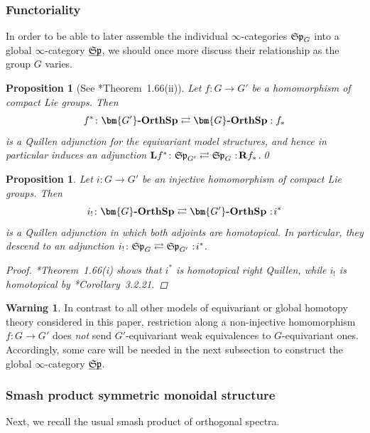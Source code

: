 \documentclass[reqno]{memo-l}
\theoremstyle{mythm}
\newtheorem{prop}[thm]{Proposition}
\theoremstyle{definition}
\newtheorem{warn}[thm]{Warning}
\numberwithin{equation}{section}
\newcommand{\cat}[1]{\textbf{\textup{#1}}}
\newcommand{\ulhelper}[2]{\underline{\setbox0=\hbox{$#1#2$}\dp0=0.4pt \box0\relax}}
\newcommand{\ul}[1]{{\mathpalette\ulhelper{#1}}\hbox{\rule[-2pt]{0pt}{0pt}}}
\newcommand\noloc{%
	\nobreak
	\mspace{6mu plus 1mu}
	{:}
	\nonscript\mkern-\thinmuskip
	\mathpunct{}
	\mspace{2mu}
}
\newcommand{\mySp}{{\mathfrak S\kern-.5pt\mathfrak p}}
\newcommand{\Gosp}[1]{\cat{$\bm{#1}$-OrthSp}}
\begin{document}
\subsubsection{Functoriality} In order to be able to later assemble the individual $\infty$-categories $\mySp_G$ into a global $\infty$-category $\ul\mySp$, we should once more discuss their relationship as the group $G$ varies.

\begin{prop}[See \cite{DHLPS2019Proper}*{Theorem~1.66(ii)}]\label{prop:restr-left-Quillen-G-Sp}
    Let $f\colon G\to G'$ be a homomorphism of compact Lie groups. Then
    \[
        f^*\colon\Gosp{G'}\rightleftarrows\Gosp{G}:f_*
    \]
    is a Quillen adjunction for the equivariant model structures, and hence in particular induces an adjunction $\cat{L}f^*\colon\mySp_{G'}\rightleftarrows\mySp_G\noloc\cat{R}f_*$.\qed
\end{prop}

\begin{prop}\label{prop:i!-left-Quillen-equiv-sp}
    Let $i\colon G\to G'$ be an \emph{injective} homomorphism of compact Lie groups. Then
    \[
        i_!\colon\Gosp{G}\rightleftarrows\Gosp{G'}\noloc i^*
    \]
    is a Quillen adjunction in which both adjoints are homotopical. In particular, they descend to an adjunction $i_!\colon\mySp_G\rightleftarrows\mySp_{G'}\noloc i^*$.
    \begin{proof}
        \cite{DHLPS2019Proper}*{Theorem~1.66(i)} shows that $i^*$ is homotopical right Quillen, while $i_!$ is homotopical by \cite{schwede2018global}*{Corollary~3.2.21}.
    \end{proof}
\end{prop}

\begin{warn}
    In contrast to all other models of equivariant or global homotopy theory considered in this paper, restriction along a non-injective homomorphism $f\colon G\to G'$ does \emph{not} send $G'$-equivariant weak equivalences to $G$-equivariant ones. Accordingly, some care will be needed in the next subsection to construct the global $\infty$-category $\ul\mySp$.
\end{warn}

\subsubsection{Smash product symmetric monoidal structure} Next, we recall the usual smash product of orthogonal spectra.
\end{document}
